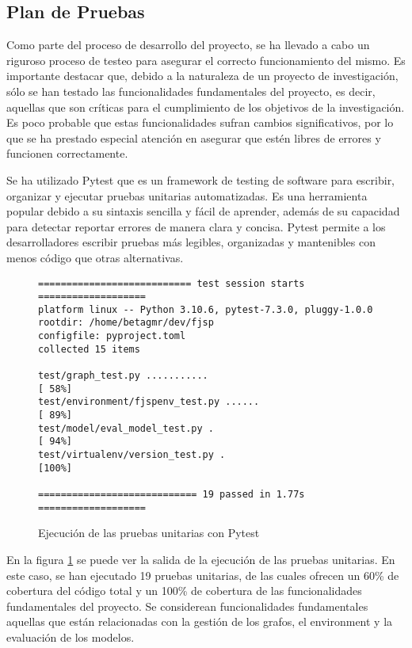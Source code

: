 \subsection{Plan de Pruebas}
Como parte del proceso de desarrollo del proyecto, se ha llevado a cabo un riguroso 
proceso de testeo para asegurar el correcto funcionamiento del mismo. Es importante 
destacar que, debido a la naturaleza de un proyecto de investigación, sólo se han 
testado las funcionalidades fundamentales del proyecto, es decir, aquellas que 
son críticas para el cumplimiento de los objetivos de la investigación. Es poco 
probable que estas funcionalidades sufran cambios significativos, por lo que se ha 
prestado especial atención en asegurar que estén libres de errores y funcionen correctamente.\medskip

Se ha utilizado Pytest que es un framework de testing de software para escribir, 
organizar y ejecutar pruebas unitarias automatizadas. Es una herramienta popular 
debido a su sintaxis sencilla y fácil de aprender, además de su capacidad para detectar 
reportar errores de manera clara y concisa. Pytest permite a los desarrolladores 
escribir pruebas más legibles, organizadas y mantenibles con menos código 
que otras alternativas. 

\begin{figure}[ht]
    \label{fig:pytest-output}
    \begin{lstlisting}
=========================== test session starts ===================
platform linux -- Python 3.10.6, pytest-7.3.0, pluggy-1.0.0
rootdir: /home/betagmr/dev/fjsp
configfile: pyproject.toml
collected 15 items                                                         

test/graph_test.py ...........                               [ 58%]
test/environment/fjspenv_test.py ......                      [ 89%]
test/model/eval_model_test.py .                              [ 94%]
test/virtualenv/version_test.py .                            [100%]

============================ 19 passed in 1.77s =================== 
    \end{lstlisting}
    \caption{Ejecución de las pruebas unitarias con Pytest}
\end{figure}

En la figura \ref{fig:pytest-output} se puede ver la salida de la ejecución de las
pruebas unitarias. En este caso, se han ejecutado 19 pruebas unitarias, de las cuales
ofrecen un 60\% de cobertura del código total y un 100\% de cobertura de las funcionalidades
fundamentales del proyecto. Se considerean funcionalidades fundamentales aquellas que
están relacionadas con la gestión de los grafos, el environment y la evaluación de los
modelos.
